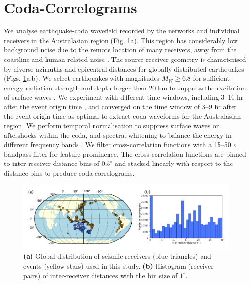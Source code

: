 \section{Coda-Correlograms}\label{sec:theo_cc}

We analyse earthquake-coda wavefield recorded by the networks and individual receivers in the Australasian region (Fig. \ref{fig:2.1}a). This region has considerably low background noise due to the remote location of many receivers, away from the coastline and human-related noise \citep{kennett2008stochastic,kennett_multiscale_2016}. The source-receiver geometry is characterised by diverse azimuths and epicentral distances for globally distributed earthquakes (Figs. \ref{fig:2.1}a,b). We select earthquakes with magnitudes $M_W\geq6.8$ for sufficient energy-radiation strength and depth larger than 20 km to suppress the excitation of surface waves  \citep{poli_analysis_2017,pham_earths_2018}. We experiment with different time windows, including 3--10 hr after the event origin time \citep{pham_earths_2018,tkalcic_shear_2018}, and converged on the time window of 3--9 hr after the event origin time as optimal to extract coda waveforms for the Australasian region. We perform temporal normalisation to suppress surface waves or aftershocks within the coda, and spectral whitening to balance the energy in different frequency bands \citep{bensen_processing_2007,pham_earths_2018}. We filter cross-correlation functions with a 15--50 s bandpass filter for feature prominence. The cross-correlation functions are binned to inter-receiver distance bins of $0.5^{\circ}$ and stacked linearly with respect to the distance bins to produce coda correlograms.




\begin{figure}[!hbt]
	\centering
	\includegraphics[width=1\linewidth]{figs/correlation_formation/fig_p1_01.pdf}
	\caption[Global events and seismic receivers for analysing coda-correlation's formation]
    {\textbf{(a)} Global distribution of seismic receivers (blue triangles) and events (yellow stars) used in this study. \textbf{(b)} Histogram (receiver pairs) of inter-receiver distances with the bin size of $1^{\circ}$.}
	\label{fig:2.1}
\end{figure}



